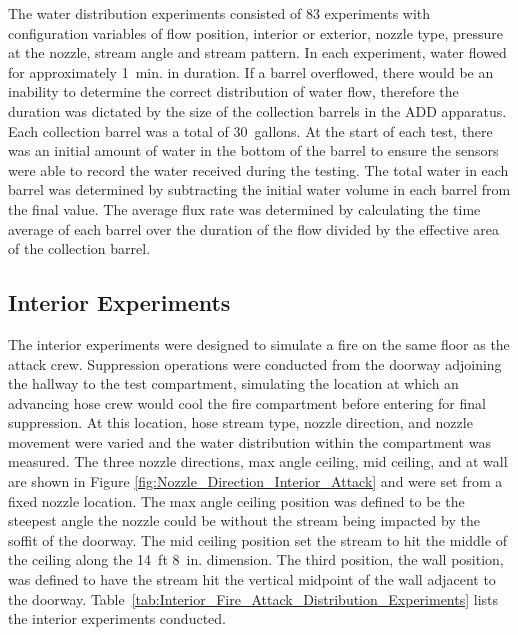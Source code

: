 \documentclass[12pt,oneside]{book}
\begin{document}
The water distribution experiments consisted of 83 experiments with configuration variables of flow position, interior or exterior, nozzle type, pressure at the nozzle, stream angle and stream pattern. In each experiment, water flowed for approximately 1~min. in duration. If a barrel overflowed, there would be an inability to determine the correct distribution of water flow, therefore the duration was dictated by the size of the collection barrels in the ADD apparatus. Each collection barrel was a total of 30~gallons.  At the start of each test, there was an initial amount of water in the bottom of the barrel to ensure the sensors were able to record the water received during the testing. The total water in each barrel was determined by subtracting the initial water volume in each barrel from the final value. The average flux rate was determined by calculating the time average of each barrel over the duration of the flow divided by the effective area of the collection barrel. 

\subsection{Interior Experiments}
\label{int_tests}
The interior experiments were designed to simulate a fire on the same floor as the attack crew. Suppression operations were conducted from the doorway adjoining the hallway to the test compartment, simulating the location at which an advancing hose crew would cool the fire compartment before entering for final suppression. At this location, hose stream type, nozzle direction, and nozzle movement were varied and the water distribution within the compartment was measured. The three nozzle directions, max angle ceiling, mid ceiling, and at wall are shown in Figure \ref{fig:Nozzle_Direction_Interior_Attack} and were set from a fixed nozzle location. The max angle ceiling position was defined to be the steepest angle the nozzle could be without the stream being impacted by the soffit of the doorway. The mid ceiling position set the stream to hit the middle of the ceiling along the 14~ft 8~in. dimension. The third position, the wall position, was defined to have the stream hit the vertical midpoint of the wall adjacent to the doorway. Table~\ref{tab:Interior_Fire_Attack_Distribution_Experiments} lists the interior experiments conducted.
\end{document}

